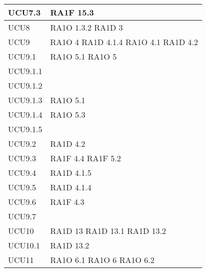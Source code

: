 \begin{center}
\begin{longtable}{ | p{5cm} | p{5cm} |}
            UCU7.3 &  RA1F 15.3 \newline  \\ \hline      
            UCU8 &  RA1O 1.3.2 \newline  RA1D 3  \newline  \\ \hline      
            UCU9 &  RA1O 4 \newline  RA1D 4.1.4  \newline  RA1O 4.1  \newline  RA1D 4.2  \newline  \\ \hline      
            UCU9.1 &  RA1O 5.1 \newline  RA1O 5  \newline  \\ \hline      
            UCU9.1.1 &  \\ \hline      
            UCU9.1.2 &  \\ \hline      
            UCU9.1.3 &  RA1O 5.1 \newline  \\ \hline      
            UCU9.1.4 &  RA1O 5.3 \newline  \\ \hline      
            UCU9.1.5 &  \\ \hline      
            UCU9.2 &  RA1D 4.2  \newline  \\ \hline      
            UCU9.3 &  RA1F 4.4 \newline  RA1F 5.2 \newline  \\ \hline      
            UCU9.4 &  RA1D 4.1.5 \newline  \\ \hline      
            UCU9.5 &  RA1D 4.1.4  \newline  \\ \hline      
            UCU9.6 &  RA1F 4.3 \newline  \\ \hline      
            UCU9.7 &  \\ \hline      
            UCU10 &  RA1D 13 \newline  RA1D 13.1 \newline  RA1D 13.2 \newline  \\ \hline      
            UCU10.1 &  RA1D 13.2 \newline  \\ \hline      
            UCU11 &  RA1O 6.1  \newline  RA1O 6 \newline  RA1O 6.2  \newline  \\ \hline      

\end{longtable}
\end{center}

